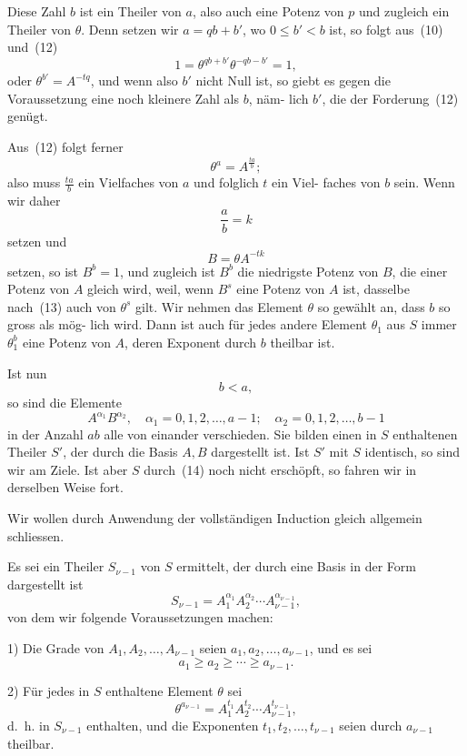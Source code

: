 \documentclass[12pt,a4paper]{article}
\theoremstyle{plain}
\theoremstyle{definition}
\theoremstyle{remark}
\begin{document}
Diese Zahl $b$ ist ein Theiler von $a$, also auch eine Potenz
von $p$ und zugleich ein Theiler von $\theta$. Denn setzen wir
$a = qb + b'$, wo $0 \leq b' < b$ ist, so folgt aus~(10) und~(12)
\[
1 = \theta^{qb+b'} \theta^{-qb-b'} = 1,
\]
oder $\theta^{b'} = A^{-tq}$, und wenn also $b'$ nicht Null ist, so giebt es
gegen die Voraussetzung eine noch kleinere Zahl als $b$, näm-
lich $b'$, die der Forderung~(12) genügt.

Aus~(12) folgt ferner
\[
\theta^a = A^{\frac{ta}{b}};
\]
also muss $\frac{ta}{b}$ ein Vielfaches von $a$ und folglich $t$ ein Viel-
faches von $b$ sein. Wenn wir daher
\[
\frac{a}{b} = k
\]
setzen und
\begin{equation}\tag{13}
B = \theta A^{-tk}
\end{equation}
setzen, so ist $B^b = 1$, und zugleich ist $B^b$ die niedrigste Potenz
von $B$, die einer Potenz von $A$ gleich wird, weil, wenn $B^s$ eine
Potenz von $A$ ist, dasselbe nach~(13) auch von $\theta^s$ gilt. Wir
nehmen das Element $\theta$ so gewählt an, dass $b$ so gross als mög-
lich wird. Dann ist auch für jedes andere Element $\theta_1$ aus $S$
immer $\theta_1^b$ eine Potenz von $A$, deren Exponent durch $b$ theilbar ist.

Ist nun
\[
b < a,
\]
so sind die Elemente
\begin{equation}\tag{14}
A^{\alpha_1} B^{\alpha_2}, \quad \alpha_1 = 0, 1, 2, \ldots, a-1; \quad \alpha_2 = 0, 1, 2, \ldots, b-1
\end{equation}
in der Anzahl $ab$ alle von einander verschieden. Sie bilden
einen in $S$ enthaltenen Theiler $S'$, der durch die Basis $A, B$
dargestellt ist. Ist $S'$ mit $S$ identisch, so sind wir am Ziele.
Ist aber $S$ durch~(14) noch nicht erschöpft, so fahren wir
in derselben Weise fort.

Wir wollen durch Anwendung der vollständigen Induction
gleich allgemein schliessen.

Es sei ein Theiler $S_{\nu-1}$ von $S$ ermittelt, der durch eine
Basis in der Form dargestellt ist
\begin{equation}\tag{15}
S_{\nu-1} = A_1^{\alpha_1} A_2^{\alpha_2} \cdots A_{\nu-1}^{\alpha_{\nu-1}},
\end{equation}
von dem wir folgende Voraussetzungen machen:

1) Die Grade von $A_1, A_2, \ldots, A_{\nu-1}$ seien $a_1, a_2, \ldots, a_{\nu-1}$,
und es sei
\[
a_1 \geq a_2 \geq \cdots \geq a_{\nu-1}.
\]

2) Für jedes in $S$ enthaltene Element $\theta$ sei
\begin{equation}\tag{16}
\theta^{a_{\nu-1}} = A_1^{t_1} A_2^{t_2} \cdots A_{\nu-1}^{t_{\nu-1}},
\end{equation}
d.~h. in $S_{\nu-1}$ enthalten, und die Exponenten $t_1, t_2, \ldots, t_{\nu-1}$ seien
durch $a_{\nu-1}$ theilbar.
\end{document}
